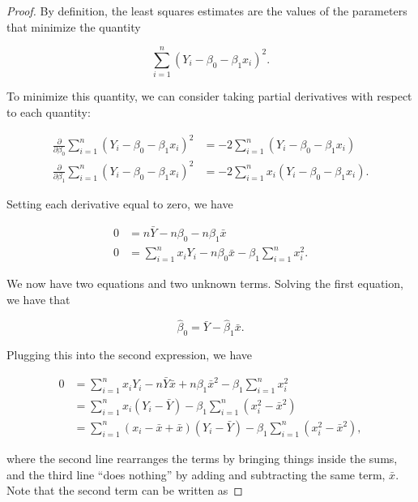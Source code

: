 \documentclass[
  letterpaper,
  DIV=11,
  numbers=noendperiod]{scrreprt}
\theoremstyle{definition}
\theoremstyle{definition}
\theoremstyle{plain}
\theoremstyle{remark}
\begin{document}
\begin{proof}

By definition, the least squares estimates are the values of the
parameters that minimize the quantity

\[\sum_{i=1}^{n} \left(Y_i - \beta_0 - \beta_1 x_i\right)^2.\]

To minimize this quantity, we can consider taking partial derivatives
with respect to each quantity:

\[
\begin{aligned}
  \frac{\partial}{\partial \beta_0} \sum_{i=1}^{n} \left(Y_i - \beta_0 - \beta_1 x_i\right)^2
    &= -2 \sum_{i=1}^{n} \left(Y_i - \beta_0 - \beta_1 x_i\right) \\
  \frac{\partial}{\partial \beta_1} \sum_{i=1}^{n} \left(Y_i - \beta_0 - \beta_1 x_i\right)^2
    &= -2 \sum_{i=1}^{n} x_i \left(Y_i - \beta_0 - \beta_1 x_i\right).
\end{aligned}
\]

Setting each derivative equal to zero, we have

\[
\begin{aligned}
  0 
    &= n\bar{Y} - n\beta_0 - n\beta_1 \bar{x} \\
  0
    &= \sum_{i=1}^{n} x_i Y_i - n\beta_0 \bar{x} - \beta_1 \sum_{i=1}^{n} x_i^2. 
\end{aligned}
\]

We now have two equations and two unknown terms. Solving the first
equation, we have that

\[\widehat{\beta}_0 = \bar{Y} - \widehat{\beta}_1 \bar{x}.\]

Plugging this into the second expression, we have

\[
\begin{aligned}
  0 
    &= \sum_{i=1}^{n} x_i Y_i - n\bar{Y}\bar{x} + n \beta_1 \bar{x}^2 - \beta_1 \sum_{i=1}^{n} x_i^2 \\
    &= \sum_{i=1}^{n} x_i \left(Y_i - \bar{Y}\right) - \beta_1 \sum_{i=1}^{n} \left(x_i^2 - \bar{x}^2\right) \\
    &= \sum_{i=1}^{n} \left(x_i - \bar{x} + \bar{x}\right) \left(Y_i - \bar{Y}\right) - \beta_1 \sum_{i=1}^{n} \left(x_i^2 - \bar{x}^2\right),
\end{aligned}
\]

where the second line rearranges the terms by bringing things inside the
sums, and the third line ``does nothing'' by adding and subtracting the
same term, \(\bar{x}\). Note that the second term can be written as


\end{proof}
\end{document}

